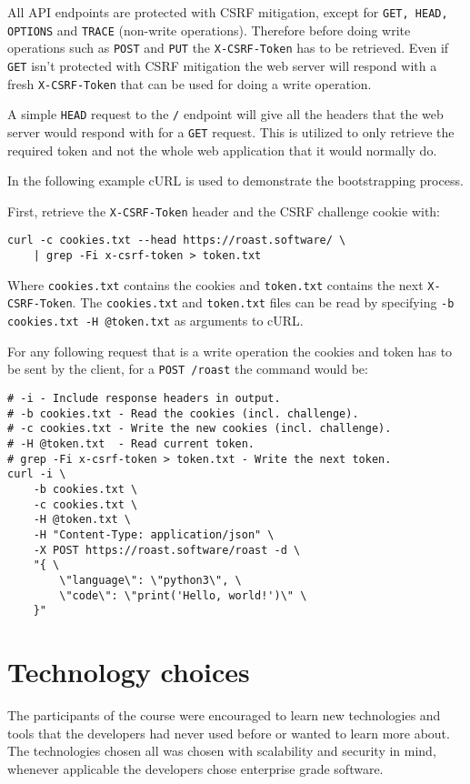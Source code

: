 \documentclass[12pt,a4paper]{report}
\begin{document}
All API endpoints are protected with CSRF mitigation, except for \texttt{GET, HEAD, OPTIONS} and \texttt{TRACE} (non-write operations). Therefore before doing write operations such as \texttt{POST} and \texttt{PUT} the \texttt{X-CSRF-Token} has to be retrieved. Even if \texttt{GET} isn't protected with CSRF mitigation the web server will respond with a fresh \texttt{X-CSRF-Token} that can be used for doing a write operation.

A simple \texttt{HEAD} request to the \texttt{/} endpoint will give all the headers that the web server would respond with for a \texttt{GET} request. This is utilized to only retrieve the required token and not the whole web application that it would normally do.

In the following example cURL is used to demonstrate the bootstrapping process.

First, retrieve the \texttt{X-CSRF-Token} header and the CSRF challenge cookie with:
\begin{verbatim}
curl -c cookies.txt --head https://roast.software/ \
    | grep -Fi x-csrf-token > token.txt
\end{verbatim}
Where \texttt{cookies.txt} contains the cookies and \texttt{token.txt} contains the next \texttt{X-CSRF-Token}.
The \texttt{cookies.txt} and \texttt{token.txt} files can be read by specifying \texttt{-b cookies.txt -H @token.txt} as arguments to cURL.

\newpage
For any following request that is a write operation the cookies and token has to be sent by the client, for a \texttt{POST /roast} the command would be:
\begin{verbatim}
# -i - Include response headers in output.
# -b cookies.txt - Read the cookies (incl. challenge).
# -c cookies.txt - Write the new cookies (incl. challenge).
# -H @token.txt  - Read current token.
# grep -Fi x-csrf-token > token.txt - Write the next token.
curl -i \
    -b cookies.txt \
    -c cookies.txt \
    -H @token.txt \
    -H "Content-Type: application/json" \
    -X POST https://roast.software/roast -d \
    "{ \
        \"language\": \"python3\", \
        \"code\": \"print('Hello, world!')\" \
    }"
\end{verbatim}

\chapter{Technology choices}
The participants of the course were encouraged to learn new technologies and tools that the developers had never used before or wanted to learn more about. The technologies chosen all was chosen with scalability and security in mind, whenever applicable the developers chose enterprise grade software.
\end{document}

